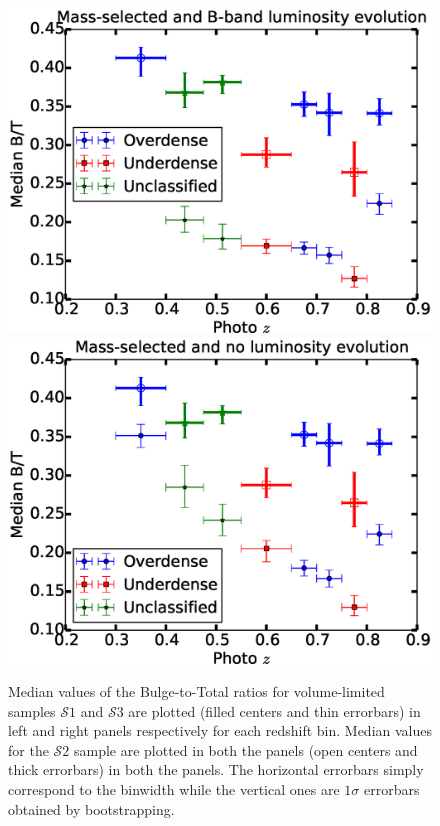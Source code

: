 \documentclass[twocolumn,useAMS,usenatbib]{mn2e}
\newcommand{\btt}{Bulge-to-Total }
\newcommand{\s}{\ensuremath{\mathcal{S}}}
\begin{document}
\begin{figure}
 \includegraphics[width=1.0\columnwidth]{median_dvcbtt1}
 \includegraphics[width=1.0\columnwidth]{median_dvcbtt2}
  \caption{Median values of the \btt ratios for volume-limited samples \s$1$ and \s$3$ are plotted (filled centers and thin errorbars) in left and right panels respectively for each redshift bin.
          Median values for the \s$2$ sample are plotted in both the panels (open centers and thick errorbars) in both the panels.
          The horizontal errorbars simply correspond to the binwidth while the vertical ones are $1\sigma$ errorbars obtained by bootstrapping.}
 \label{fig:median_dvcbtt}
\end{figure}
\end{document}

